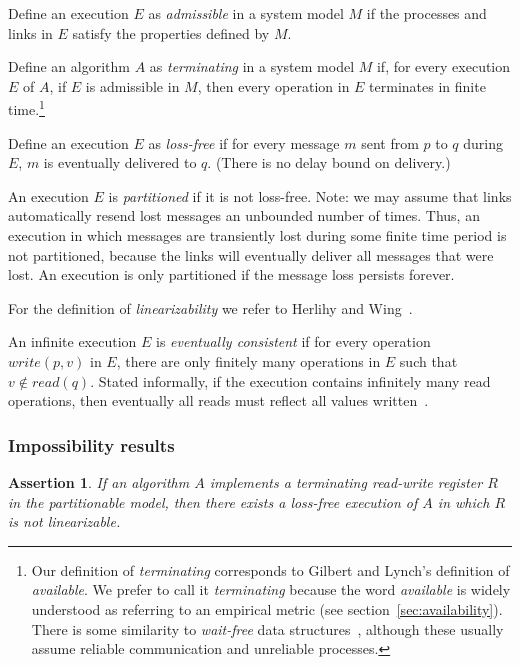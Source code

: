 \documentclass[a4paper,twocolumn,10pt]{article}
\newtheorem{theorem}{Assertion}
\begin{document}
Define an execution $E$ as \emph{admissible} in a system model $M$ if the processes and links in $E$
satisfy the properties defined by $M$.

Define an algorithm $A$ as \emph{terminating} in a system model $M$ if, for every execution $E$ of
$A$, if $E$ is admissible in $M$, then every operation in $E$ terminates in finite
time.\footnote{Our definition of \emph{terminating} corresponds to Gilbert and Lynch's definition of
\emph{available}. We prefer to call it \emph{terminating} because the word \emph{available} is
widely understood as referring to an empirical metric (see section~\ref{sec:availability}). There is
some similarity to \emph{wait-free} data structures~\cite{Herlihy1988br}, although these usually
assume reliable communication and unreliable processes.}

Define an execution $E$ as \emph{loss-free} if for every message $m$ sent from $p$ to $q$ during
$E$, $m$ is eventually delivered to $q$. (There is no delay bound on delivery.)

An execution $E$ is \emph{partitioned} if it is not loss-free. Note: we may assume that links
automatically resend lost messages an unbounded number of times. Thus, an execution in which
messages are transiently lost during some finite time period is not partitioned, because the links
will eventually deliver all messages that were lost. An execution is only partitioned if the message
loss persists forever.

For the definition of \emph{linearizability} we refer to Herlihy and Wing~\cite{Herlihy1990jq}.

An infinite execution $E$ is \emph{eventually consistent} if for every operation
$\mathit{write}(p, v)$ in $E$, there are only finitely many operations in $E$ such that
$v \notin \mathit{read}(q)$. Stated informally, if the execution contains infinitely many read
operations, then eventually all reads must reflect all values written~\cite{Attiya2015dm}.

\subsubsection{Impossibility results}\label{sec:impossibility}

\begin{theorem}\label{th:1}
If an algorithm $A$ implements a terminating read-write register $R$ in the partitionable model,
then there exists a loss-free execution of $A$ in which $R$ is not linearizable.
\end{theorem}
\end{document}
